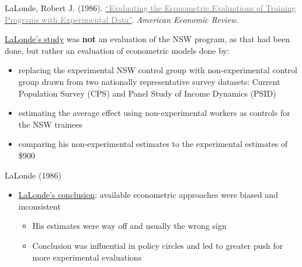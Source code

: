 \documentclass{beamer}
\newcommand{\myurlshort}[2]{\href{#1}{\textcolor{gray}{\textsf{#2}}}}
\begin{document}
\begin{frame}[plain]
	\begin{center}
	LaLonde, Robert J. (1986). \myurlshort{http://business.baylor.edu/scott_cunningham/teaching/lalonde-1986.pdf}{``Evaluating the Econometric Evaluations of Training Programs with Experimental Data''}. \emph{American Economic Review}. 
	\end{center}
	
\underline{LaLonde's study} was \textbf{not} an evaluation of the NSW program, as that had been done, but rather an evaluation of econometric models done by:
		\begin{itemize}
		\item replacing the experimental NSW control group with non-experimental control group drawn from two nationally representative survey datasets: Current Population Survey (CPS) and Panel Study of Income Dynamics (PSID)
		\item estimating the average effect using non-experimental workers as controls for the NSW trainees 
		\item comparing his non-experimental estimates to the experimental estimates of \$900
		\end{itemize}
\end{frame}

\begin{frame}{LaLonde (1986)}

\begin{itemize}

	\item \underline{LaLonde's conclusion}: available econometric approaches were biased and inconsistent
		\begin{itemize}
		\item His estimates were way off and usually the wrong sign
		\item Conclusion was influential in policy circles and led to greater push for more experimental evaluations
		\end{itemize}

\end{itemize}

\end{frame}

\end{document}
